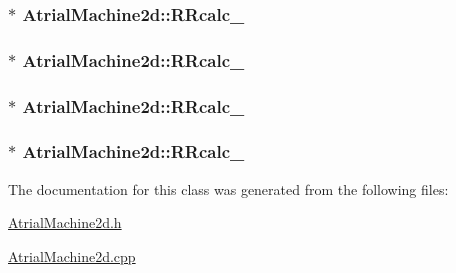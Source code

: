 \hypertarget{class_atrial_machine2d_ace665fff3f0583d9d1e285f4775adfa6}{
\subsubsection[{R\+Rcalc\+\_\+1}]{$\ast$ Atrial\+Machine2d\+::\+R\+Rcalc\+\_}}\label{class_atrial_machine2d_ace665fff3f0583d9d1e285f4775adfa6}
\hypertarget{class_atrial_machine2d_a34b1581457faa0fec1579cf51a187598}{
\subsubsection[{R\+Rcalc\+\_\+2}]{$\ast$ Atrial\+Machine2d\+::\+R\+Rcalc\+\_}}\label{class_atrial_machine2d_a34b1581457faa0fec1579cf51a187598}
\hypertarget{class_atrial_machine2d_a0bcbe6368dd8bb0eb66efaafc5a4dbfb}{
\subsubsection[{R\+Rcalc\+\_\+3}]{$\ast$ Atrial\+Machine2d\+::\+R\+Rcalc\+\_}}\label{class_atrial_machine2d_a0bcbe6368dd8bb0eb66efaafc5a4dbfb}
\hypertarget{class_atrial_machine2d_aa2ede01ca50864789c112cca567c1444}{
\subsubsection[{R\+Rcalc\+\_\+4}]{$\ast$ Atrial\+Machine2d\+::\+R\+Rcalc\+\_}}\label{class_atrial_machine2d_aa2ede01ca50864789c112cca567c1444}


The documentation for this class was generated from the following files\+:\begin{DoxyCompactItemize}
\item 
\hyperlink{_atrial_machine2d_8h}{Atrial\+Machine2d.\+h}\item 
\hyperlink{_atrial_machine2d_8cpp}{Atrial\+Machine2d.\+cpp}\end{DoxyCompactItemize}
